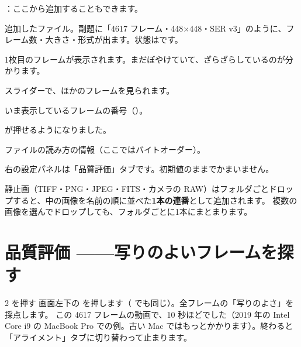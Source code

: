 \begin{marklist}
  \item {}：ここから追加することもできます。
  \item 追加したファイル。副題に「4617 フレーム・448×448・SER v3」のように、フレーム数・大きさ・形式が出ます。状態はです。
  \item 1枚目のフレームが表示されます。まだぼやけていて、ざらざらしているのが分かります。
  \item スライダーで、ほかのフレームを見られます。
  \item いま表示しているフレームの番号（）。
  \item {} が押せるようになりました。
  \item ファイルの読み方の情報（ここではバイトオーダー）。
  \item 右の設定パネルは「品質評価」タブです。初期値のままでかまいません。
\end{marklist}

\begin{tip}[フォルダごと追加する]
  静止画（TIFF・PNG・JPEG・FITS・カメラの RAW）はフォルダごとドロップすると、中の画像を名前の順に並べた\textbf{1本の連番}として追加されます。
  複数の画像を選んでドロップしても、フォルダごとに1本にまとまります。
\end{tip}

\section{品質評価 ——写りのよいフレームを探す}\label{sec:qs-quality}

\begin{step}{2}{ を押す}
  画面左下の  を押します（ でも同じ）。全フレームの「写りのよさ」を採点します。
  この 4617 フレームの動画で、10 秒ほどでした（2019 年の Intel Core i9 の MacBook Pro での例。古い Mac ではもっとかかります）。終わると「アライメント」タブに切り替わって止まります。
\end{step}


